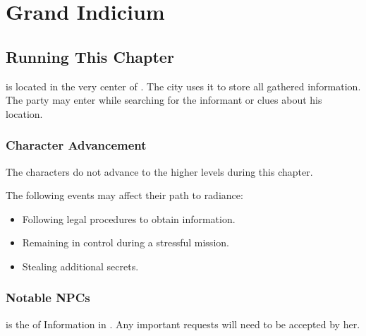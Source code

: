 \chapter{Grand Indicium}
\label{chap:chapterIndicium}

\setcounter{section}{-1}
\section{Running This Chapter}

\locationIndicium{} is located in the very center of \locationYeddaw{}. The city uses it to store all gathered information. The party may enter while searching for the informant or clues about his location.

\subsection{Character Advancement}

The characters do not advance to the higher levels during this chapter.

The following events may affect their path to radiance:
\begin{itemize}
	\item Following legal procedures to obtain information.
	\item Remaining in control during a stressful mission.
	\item Stealing additional secrets.
\end{itemize}


\subsection{Notable NPCs}

\npcGhenna[s] is the \enemyScribeC{} of Information in \locationIndicium{}. Any important requests will need to be accepted by her.




\newpage



